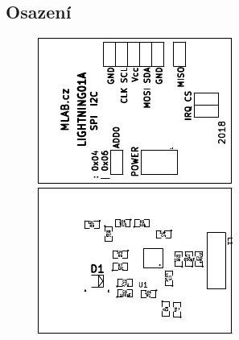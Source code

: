 \subsection{Osazení}


\begin{figure}[ht!]
	\centering
	\includegraphics[scale=2]{../../doc/src/LIGHTNING01A-top_cropped.pdf}
	\qquad
	\includegraphics[scale=2]{../../doc/src/LIGHTNING01A-bottom_cropped.pdf}
\end{figure}

